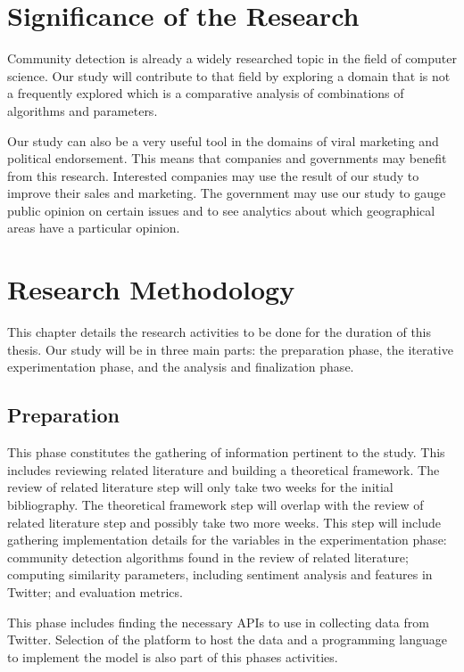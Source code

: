 \section{Significance of the Research}
\label{sec:significance}

Community detection is already a widely researched topic in the field of computer science. Our study will contribute to that field by exploring a domain that is not a frequently explored which is a comparative analysis of combinations of algorithms and parameters.

Our study can also be a very useful tool in the domains of viral marketing and political endorsement. This means that companies and governments may benefit from this research. Interested companies may use the result of our study to improve their sales and marketing. The government may use our study to gauge public opinion on certain issues and to see analytics about which geographical areas have a particular opinion. 

\section{Research Methodology}
This chapter details the research activities to be done for the duration of this thesis. Our study will be in three main parts: the preparation phase, the iterative experimentation phase, and the analysis and finalization phase.

\subsection{Preparation}

This phase constitutes the gathering of information pertinent to the study. This includes reviewing related literature and building a theoretical framework. The review of related literature step will only take two weeks for the initial bibliography. The theoretical framework step will overlap with the review of related literature step and possibly take two more weeks. This step will include gathering implementation details for the variables in the experimentation phase: community detection algorithms found in the review of related literature; computing similarity parameters, including sentiment analysis and features in Twitter; and evaluation metrics. 

This phase includes finding the necessary API\vtick s to use in collecting data from Twitter. Selection of the platform to host the data and a programming language to implement the model is also part of this phase\vtick s activities. 


